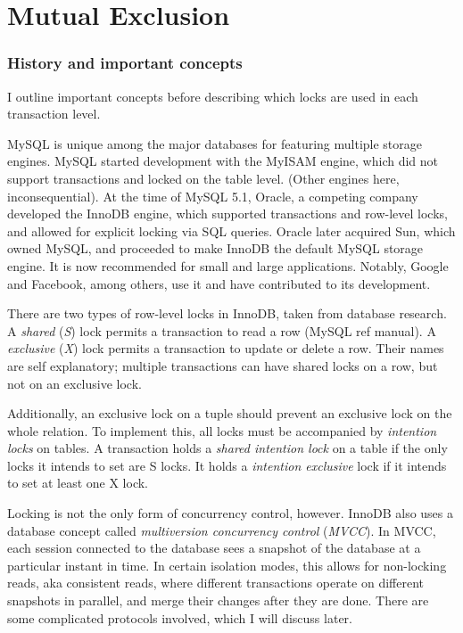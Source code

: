 \documentclass[12pt]{article} %
\begin{document}

\section{Mutual Exclusion} %

\subsubsection{History and important concepts}
I outline important concepts before describing which locks are used in each transaction level.

MySQL is unique among the major databases for featuring multiple storage engines. MySQL started development with the MyISAM engine, which did not support transactions and locked on the table level. (Other engines here, inconsequential). At the time of MySQL 5.1, Oracle, a competing company developed the InnoDB engine, which supported transactions and row-level locks, and allowed for explicit locking via SQL queries. Oracle later acquired Sun, which owned MySQL, and proceeded to make InnoDB the default MySQL storage engine. It is now recommended for small and large applications. Notably, Google and Facebook, among others, use it and have contributed to its development.

There are two types of row-level locks in InnoDB, taken from database research. A \textit{shared} (\textit{S}) lock permits a transaction to read a row (MySQL ref manual). A \textit{exclusive} (\textit{X}) lock permits a transaction to update or delete a row. Their names are self explanatory; multiple transactions can have shared locks on a row, but not on an exclusive lock.

Additionally, an exclusive lock on a tuple should prevent an exclusive lock on the whole relation. To implement this, all locks must be accompanied by \textit{intention locks} on tables. A transaction holds a \textit{shared intention lock} on a table if the only locks it intends to set are S locks. It holds a \textit{intention exclusive} lock if it intends to set at least one X lock.

Locking is not the only form of concurrency control, however. InnoDB also uses a database concept called \textit{multiversion concurrency control} (\textit{MVCC}). In MVCC, each session connected to the database sees a snapshot of the database at a particular instant in time. In certain isolation modes, this allows for non-locking reads, aka consistent reads, where different transactions operate on different snapshots in parallel, and merge their changes after they are done. There are some complicated protocols involved, which I will discuss later.
\end{document}
